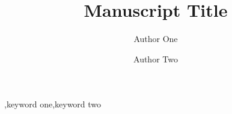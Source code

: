 \documentclass[a4paper,fleqn]{cas-dc}
\begin{document}
\let\WriteBookmarks\relax
{}
\title[mode=title]{Manuscript Title}
\author[1]{Author One}
\author[1]{Author Two}
\begin{abstract}\end{abstract}
\begin{keywords}\sep keyword one\sep keyword two\end{keywords}
\maketitle

\nocite{example2026}


\end{document}
